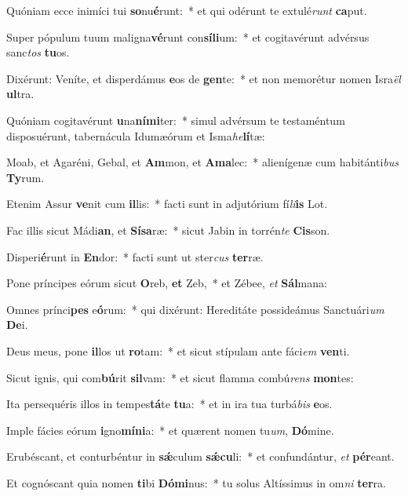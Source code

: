 \item Quóniam ecce inimíci tui \textbf{so}nu\textbf{é}runt:~* et qui odérunt te extulé\textit{runt} \textbf{ca}put.
\item Super pópulum tuum maligna\textbf{vé}runt con\textbf{sí}\textbf{li}um:~* et cogitavérunt advérsus sanc\textit{tos} \textbf{tu}os.
\item Dixérunt: Veníte, et disperdámus \textbf{e}os de \textbf{gen}te:~* et non memorétur nomen Isra\textit{ël} \textbf{ul}tra.
\item Quóniam cogitavérunt \textbf{u}na\textbf{ní}\textbf{mi}ter:~* simul advérsum te testaméntum disposuérunt, tabernácula Idumæórum et Isma\textit{he}\textbf{lí}tæ:
\item Moab, et Agaréni, Gebal, et \textbf{Am}mon, et \textbf{A}\textbf{ma}lec:~* alienígenæ cum habitánti\textit{bus} \textbf{Ty}rum.
\item Etenim Assur \textbf{ve}nit cum \textbf{il}lis:~* facti sunt in adjutórium fí\textit{li}\textbf{is} Lot.
\item Fac illis sicut Mádi\textbf{an}, et \textbf{Sí}\textbf{sa}ræ:~* sicut Jabin in torrén\textit{te} \textbf{Cis}son.
\item Disperi\textbf{é}runt in \textbf{En}dor:~* facti sunt ut ster\textit{cus} \textbf{ter}ræ.
\item Pone príncipes eórum sicut \textbf{O}reb, \textbf{et} Zeb,~* et Zébee, \textit{et} \textbf{Sál}mana:
\item Omnes prínci\textbf{pes} e\textbf{ó}rum:~* qui dixérunt: Hereditáte possideámus Sanctuári\textit{um} \textbf{De}i.
\item Deus meus, pone \textbf{il}los ut \textbf{ro}tam:~* et sicut stípulam ante fáci\textit{em} \textbf{ven}ti.
\item Sicut ignis, qui com\textbf{bú}rit \textbf{sil}vam:~* et sicut flamma combú\textit{rens} \textbf{mon}tes:
\item Ita persequéris illos in tempes\textbf{tá}te \textbf{tu}a:~* et in ira tua turbá\textit{bis} \textbf{e}os.
\item Imple fácies eórum \textbf{i}gno\textbf{mí}\textbf{ni}a:~* et quærent nomen tu\textit{um}, \textbf{Dó}mine.
\item Erubéscant, et conturbéntur in \textbf{sǽ}culum \textbf{sǽ}\textbf{cu}li:~* et confundántur, \textit{et} \textbf{pér}eant.
\item Et cognóscant quia nomen \textbf{ti}bi \textbf{Dó}\textbf{mi}nus:~* tu solus Altíssimus in om\textit{ni} \textbf{ter}ra.
